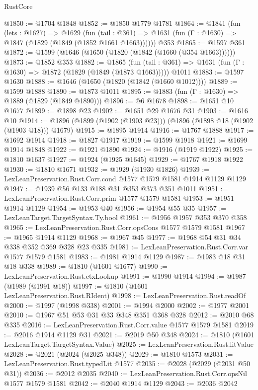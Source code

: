 \begin{lexlean}{RustCore}
\begin{coremodule}
@1850 := @1704 @1848
@1852 := @1850 @1779 @1781
@1864 := @1841
    (fun (lets : @1627) =>
    @1629
      (fun (tail : @361) => @1631 (fun (Γ : @1630) => @1847 (@1829 (@1849 (@1852 @1661 @1663))))))
    @353
@1865 := @1597 @361
@1872 := @1599 (@1646 (@1650 (@1820 (@1842 (@1660 (@354 @1663))))))
@1873 := @1852 @353
@1882 := @1865
    (fun (tail : @361) => @1631 (fun (Γ : @1630) => @1872 (@1829 (@1849 (@1873 @1663)))))
    @1011
@1883 := @1597 @1630
@1888 := @1646 (@1650 (@1820 (@1842 (@1660 @1012))))
@1889 := @1599 @1888
@1890 := @1873 @1011
@1895 := @1883 (fun (Γ : @1630) => @1889 (@1829 (@1849 @1890)))
@1896 := @6 @1678
@1898 := @1651 @10 @1677
@1899 := @1898 @23
@1902 := @1651 @29 @1676 @31
@1903 := @1616 @10
@1914 := @1896 (@1899 (@1902 (@1903 @23))) (@1896 (@1898 @18 (@1902 (@1903 @18))) @1679)
@1915 := @1895 @1914
@1916 := @1767 @1888
@1917 := @1692 @1914
@1918 := @1827 @1917
@1919 := @1599 @1918
@1921 := @1699 @1914 @1848
@1922 := @1921 @1890
@1924 := @1916 (@1919 @1922)
@1925 := @1810 @1637
@1927 := @1924 (@1925 @1645)
@1929 := @1767 @1918 @1922
@1930 := @1810 @1671
@1932 := @1929 (@1930 @1826)
@1939 := LexLeanPreservation.Rust.Corr.cond @1577 @1579 @1581 @1914 @1129 @1129
@1947 := @1939 @56 @133 @188 @31 @353 @373 @351 @1011
@1951 := LexLeanPreservation.Rust.Corr.prim @1577 @1579 @1581
@1953 := @1951 @1914 @1129
@1954 := @1953 @40
@1956 := @1954 @55 @35
@1957 := LexLeanTarget.TargetSyntax.Ty.bool
@1961 := @1956 @1957 @353 @370 @358
@1965 := LexLeanPreservation.Rust.Corr.opsCons @1577 @1579 @1581
@1967 := @1965 @1914 @1129
@1968 := @1967 @45
@1977 := @1968 @54 @31 @34 @338 @352 @369 @328 @23 @335
@1981 := LexLeanPreservation.Rust.Corr.var @1577 @1579 @1581
@1983 := @1981 @1914 @1129
@1987 := @1983 @18 @31 @18 @338
@1989 := @1810 (@1601 @1677)
@1990 := LexLeanPreservation.Rust.ctxLookup
@1991 := @1990 @1914
@1994 := @1987 (@1989 (@1991 @18))
@1997 := @1810 (@1601 LexLeanPreservation.Rust.RIdent)
@1998 := LexLeanPreservation.Rust.readOf
@2000 := @1997 (@1998 @338)
@2001 := @1994 @2000
@2002 := @1977 @2001
@2010 := @1967 @51 @53 @31 @33 @348 @351 @368 @328
@2012 := @2010 @68 @335
@2016 := LexLeanPreservation.Rust.Corr.value @1577 @1579 @1581
@2019 := @2016 @1914 @1129 @31
@2021 := @2019 @50 @348
@2024 := @1810 (@1601 LexLeanTarget.TargetSyntax.Value)
@2025 := LexLeanPreservation.Rust.litValue
@2028 := @2021 (@2024 (@2025 @348))
@2029 := @1810 @1573
@2031 := LexLeanPreservation.Rust.typedLit @1577
@2035 := @2028 (@2029 (@2031 @50 @31))
@2036 := @2012 @2035
@2040 := LexLeanPreservation.Rust.Corr.opsNil @1577 @1579 @1581
@2042 := @2040 @1914 @1129
@2043 := @2036 @2042

\end{coremodule}
\end{lexlean}

